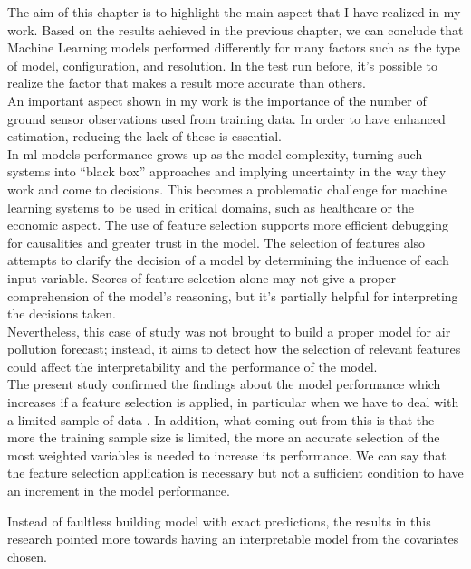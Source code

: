 The aim of this chapter is to highlight the main aspect that I have realized in my work.
Based on the results achieved in the previous chapter, we can conclude that Machine Learning models performed differently for many factors such as the type of model, configuration, and resolution.
In the test run before, it's possible to realize the factor that makes a result more accurate than others.\\
An important aspect shown in my work is the importance of the number of ground sensor observations used from training data. In order to have enhanced estimation, reducing the lack of these is essential.\\
In \acrshort{ml} models performance grows up as the model complexity, turning such systems into “black box” approaches and implying uncertainty in the way they work and come to decisions. 
This becomes a problematic challenge for machine learning systems to be used in critical domains, such as healthcare or the economic aspect.
The use of feature selection supports more efficient debugging for causalities and greater trust in the model.
The selection of features also attempts to clarify the decision of a model by determining the influence of each input variable. 
Scores of feature selection alone may not give a proper comprehension of the model’s reasoning, but it's partially helpful for interpreting the decisions taken.\\
Nevertheless, this case of study was not brought to build a proper model for air pollution forecast; instead, it aims to detect how the selection of relevant features could affect the interpretability and the performance of the model. \\
The present study confirmed the findings about the model performance which increases if a feature selection is applied, in particular when we have to deal with a limited sample of data \cite{vabalas2019machine}. 
In addition, what coming out from this is that the more the training sample size is limited, the more an accurate selection of the most weighted variables is needed to increase its performance.
We can say that the feature selection application is necessary but not a sufficient condition to have an increment in the model performance.
\begin{comment}
In this work, so it is highlighted the effect of how the training in \acrshort{ml} should benefit from an accurate selection of variables. 
\end{comment}
Instead of faultless building model with exact predictions, the results in this research pointed more towards having an interpretable model from the covariates chosen. 
